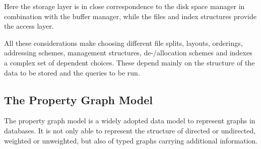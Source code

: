         Here the storage layer is in close correspondence to the disk space manager in combination with the buffer manager, while the files and index structures provide the access layer.

        All these considerations make choosing different file splits, layouts, orderings, addressing schemes, management structures, de-/allocation schemes and indexes a complex set of dependent choices. 
        These depend mainly on the structure of the data to be stored and the queries to be run.
        


    \subsection{The Property Graph Model}\label{\positionnumber}
        The property graph model is a widely adopted data model to represent graphs in databases.
        It is not only able to represent the structure of directed or undirected, weighted or unweighted, but also of typed graphs carrying additional information.
    
